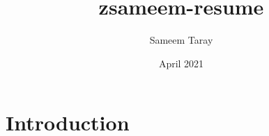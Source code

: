 \documentclass{article}
\title{zsameem-resume}
\author{Sameem Taray}
\date{April 2021}
\begin{document}
\maketitle

\section{Introduction}
\end{document}
